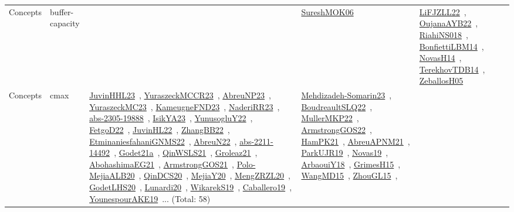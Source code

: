 {\begin{longtable}{lp{3cm}>{\raggedright\arraybackslash}p{6cm}>{\raggedright\arraybackslash}p{6cm}>{\raggedright\arraybackslash}p{8cm}}
Concepts & buffer-capacity &  & \href{works/SureshMOK06.pdf}{SureshMOK06}~\cite{SureshMOK06} & \href{works/LiFJZLL22.pdf}{LiFJZLL22}~\cite{LiFJZLL22}, \href{works/OujanaAYB22.pdf}{OujanaAYB22}~\cite{OujanaAYB22}, \href{works/RiahiNS018.pdf}{RiahiNS018}~\cite{RiahiNS018}, \href{works/BonfiettiLBM14.pdf}{BonfiettiLBM14}~\cite{BonfiettiLBM14}, \href{works/NovasH14.pdf}{NovasH14}~\cite{NovasH14}, \href{works/TerekhovTDB14.pdf}{TerekhovTDB14}~\cite{TerekhovTDB14}, \href{works/ZeballosH05.pdf}{ZeballosH05}~\cite{ZeballosH05}\\
Concepts & cmax & \href{works/JuvinHHL23.pdf}{JuvinHHL23}~\cite{JuvinHHL23}, \href{works/YuraszeckMCCR23.pdf}{YuraszeckMCCR23}~\cite{YuraszeckMCCR23}, \href{works/AbreuNP23.pdf}{AbreuNP23}~\cite{AbreuNP23}, \href{works/YuraszeckMC23.pdf}{YuraszeckMC23}~\cite{YuraszeckMC23}, \href{works/KameugneFND23.pdf}{KameugneFND23}~\cite{KameugneFND23}, \href{works/NaderiRR23.pdf}{NaderiRR23}~\cite{NaderiRR23}, \href{works/abs-2305-19888.pdf}{abs-2305-19888}~\cite{abs-2305-19888}, \href{works/IsikYA23.pdf}{IsikYA23}~\cite{IsikYA23}, \href{works/YunusogluY22.pdf}{YunusogluY22}~\cite{YunusogluY22}, \href{works/FetgoD22.pdf}{FetgoD22}~\cite{FetgoD22}, \href{works/JuvinHL22.pdf}{JuvinHL22}~\cite{JuvinHL22}, \href{works/ZhangBB22.pdf}{ZhangBB22}~\cite{ZhangBB22}, \href{works/EtminaniesfahaniGNMS22.pdf}{EtminaniesfahaniGNMS22}~\cite{EtminaniesfahaniGNMS22}, \href{works/AbreuN22.pdf}{AbreuN22}~\cite{AbreuN22}, \href{works/abs-2211-14492.pdf}{abs-2211-14492}~\cite{abs-2211-14492}, \href{works/Godet21a.pdf}{Godet21a}~\cite{Godet21a}, \href{works/QinWSLS21.pdf}{QinWSLS21}~\cite{QinWSLS21}, \href{works/Groleaz21.pdf}{Groleaz21}~\cite{Groleaz21}, \href{works/AbohashimaEG21.pdf}{AbohashimaEG21}~\cite{AbohashimaEG21}, \href{works/ArmstrongGOS21.pdf}{ArmstrongGOS21}~\cite{ArmstrongGOS21}, \href{works/Polo-MejiaALB20.pdf}{Polo-MejiaALB20}~\cite{Polo-MejiaALB20}, \href{works/QinDCS20.pdf}{QinDCS20}~\cite{QinDCS20}, \href{works/MejiaY20.pdf}{MejiaY20}~\cite{MejiaY20}, \href{works/MengZRZL20.pdf}{MengZRZL20}~\cite{MengZRZL20}, \href{works/GodetLHS20.pdf}{GodetLHS20}~\cite{GodetLHS20}, \href{works/Lunardi20.pdf}{Lunardi20}~\cite{Lunardi20}, \href{works/WikarekS19.pdf}{WikarekS19}~\cite{WikarekS19}, \href{works/Caballero19.pdf}{Caballero19}~\cite{Caballero19}, \href{works/YounespourAKE19.pdf}{YounespourAKE19}~\cite{YounespourAKE19}... (Total: 58) & \href{works/Mehdizadeh-Somarin23.pdf}{Mehdizadeh-Somarin23}~\cite{Mehdizadeh-Somarin23}, \href{works/BoudreaultSLQ22.pdf}{BoudreaultSLQ22}~\cite{BoudreaultSLQ22}, \href{works/MullerMKP22.pdf}{MullerMKP22}~\cite{MullerMKP22}, \href{works/ArmstrongGOS22.pdf}{ArmstrongGOS22}~\cite{ArmstrongGOS22}, \href{works/HamPK21.pdf}{HamPK21}~\cite{HamPK21}, \href{works/AbreuAPNM21.pdf}{AbreuAPNM21}~\cite{AbreuAPNM21}, \href{works/ParkUJR19.pdf}{ParkUJR19}~\cite{ParkUJR19}, \href{works/Novas19.pdf}{Novas19}~\cite{Novas19}, \href{works/ArbaouiY18.pdf}{ArbaouiY18}~\cite{ArbaouiY18}, \href{works/GrimesH15.pdf}{GrimesH15}~\cite{GrimesH15}, \href{works/WangMD15.pdf}{WangMD15}~\cite{WangMD15}, \href{works/ZhouGL15.pdf}{ZhouGL15}~\cite{ZhouGL15}, 
\end{longtable}}
